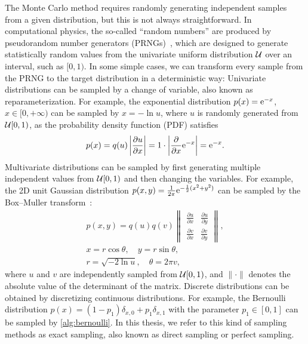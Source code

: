 The Monte Carlo method requires randomly generating independent samples from a given distribution, but this is not always straightforward. In computational physics, the so-called ``random numbers'' are produced by pseudorandom number generators (PRNGs)~\cite{press2007numerical}, which are designed to generate statistically random values from the univariate uniform distribution $\mathcal{U}$ over an interval, such as $[0, 1)$. In some simple cases, we can transform every sample from the PRNG to the target distribution in a deterministic way: Univariate distributions can be sampled by a change of variable, also known as reparameterization. For example, the exponential distribution $p(x) = \mathrm{e}^{-x}$, $x \in [0, +\infty)$ can be sampled by $x = -\ln u$, where $u$ is randomly generated from $\mathcal{U}[0, 1)$, as the probability density function (PDF) satisfies
\begin{equation}
p(x) = q(u) \left| \frac{\partial u}{\partial x} \right| = 1 \cdot \left| \frac{\partial}{\partial x} \mathrm{e}^{-x} \right| = \mathrm{e}^{-x}.
\end{equation}
Multivariate distributions can be sampled by first generating multiple independent values from $\mathcal{U}[0, 1)$ and then changing the variables. For example, the 2D unit Gaussian distribution
$p(x, y) = \frac{1}{2 \pi} \mathrm{e}^{-\frac{1}{2} (x^2 + y^2)}$ can be sampled by the Box--Muller transform~\cite{box1958note}:
\begin{gather}
p(x, y) = q(u) q(v) \begin{Vmatrix}
\frac{\partial u}{\partial x} & \frac{\partial u}{\partial y} \\
\frac{\partial v}{\partial x} & \frac{\partial v}{\partial y}
\end{Vmatrix}, \label{eq:reparam} \\
x = r \cos \theta, \quad y = r \sin \theta, \\
r = \sqrt{-2 \ln u}, \quad \theta = 2 \pi v,
\end{gather}
where $u$ and $v$ are independently sampled from $\mathcal{U}[0, 1)$, and $\lVert \cdot \rVert$ denotes the absolute value of the determinant of the matrix. Discrete distributions can be obtained by discretizing continuous distributions. For example, the Bernoulli distribution $p(x) = (1 - p_1) \delta_{x, 0} + p_1 \delta_{x, 1}$ with the parameter $p_1 \in [0, 1]$ can be sampled by \cref{alg:bernoulli}. In this thesis, we refer to this kind of sampling methods as exact sampling, also known as direct sampling or perfect sampling.

\vfill

